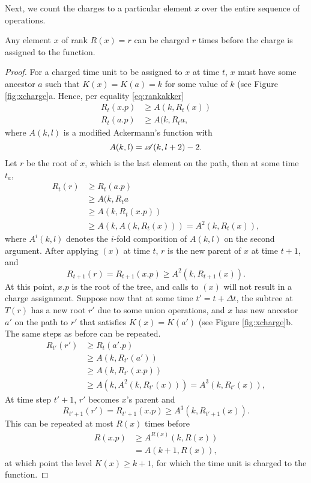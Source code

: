 Next, we count the charges to a particular element $x$ over the entire sequence of operations. 
\begin{lemma}\label{lem:xcharge}
  Any element $x$ of rank $R(x) = r$ can be charged $r$ times before the charge is assigned to the  function.
\end{lemma}
\begin{proof}
  For a charged time unit to be assigned to $x$ at time $t$, $x$ must have some ancestor $a$ such that $K(x) = K(a) = k$ for some value of $k$ (see Figure \ref{fig:xcharge}a. Hence, per equality \ref{eq:rankakker}
  \begin{align*}
    R_{t}(x.p) & \geq A(k,R_{t}(x))\\
    R_{t}(a.p) & \geq A(k,R_{t}a,
  \end{align*}
  where $A(k,l)$ is a modified Ackermann's function with 
  \begin{equation*}
    A(k,l) = \mathscr{A}(k,l+2)-2.
  \end{equation*}
  Let $r$ be the root of $x$, which is the last element on the path, then at some time $t_a$,
  \begin{align*}
    R_{t}(r) &\geq R_{t}(a.p) \\
    &\geq A(k,R_{t}a \\
    &\geq A(k,R_{t}(x.p)) \\
    &\geq A(k, A(k, R_{t}(x))) = A^2(k, R_{t}(x)),
  \end{align*}
  where $A^i(k,l)$ denotes the $i$-fold composition of $A(k,l)$ on the second argument. After applying $(x)$ at time $t$, $r$ is the new parent of $x$ at time $t+1$, and 
  \begin{equation*}
    R_{t+1}(r) = R_{t+1}(x.p) \geq A^2(k, R_{t+1}(x)).
  \end{equation*}
  At this point, $x.p$ is the root of the tree, and calls to $(x)$ will not result in a charge assignment. Suppose now that at some time $t' = t + \Delta t$, the subtree at $T(r)$ has a new root $r'$ due to some union operations, and $x$ has new ancestor $a'$ on the path to $r'$ that satisfies $K(x) = K(a')$ (see Figure \ref{fig:xcharge}b. The same steps as before can be repeated. 
  \begin{align*}
    R_{t'}(r') &\geq R_{t}(a'.p) \\
    &\geq A(k,R_{t'}(a')) \\
    &\geq A(k,R_{t'}(x.p)) \\
    &\geq A(k, A^2(k, R_{t'}(x))) = A^3(k, R_{t'}(x)),
  \end{align*}
  At time step $t'+1$, $r'$ becomes $x$'s parent and
  \begin{equation*}
    R_{t'+1}(r') = R_{t'+1}(x.p) \geq A^3(k, R_{t'+1}(x)).
  \end{equation*}
  This can be repeated at most $R(x)$ times before
  \begin{align*}
    R(x.p) &\geq A^{R(x)}(k,R(x)) \\
    &= A(k+1, R(x)),
  \end{align*}
  at which point the level $K(x)\geq k+1$, for which the time unit is charged to the  function. 
\end{proof}

